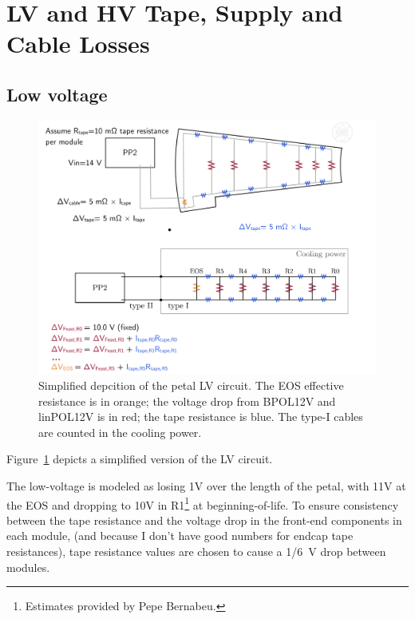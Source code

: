 
\section{LV and HV Tape, Supply and Cable Losses}

\subsection{Low voltage}
\label{low_voltage}

\begin{figure}[ht!]
\begin{center}
\includegraphics[width=0.74\linewidth]{figures/LV_cartoon.pdf}
\end{center}
\caption{Simplified depcition of the petal LV circuit. The EOS effective resistance is in orange;
the voltage drop from BPOL12V and linPOL12V is in red; the tape resistance is blue.
The type-I cables are counted in the cooling power.}
\label{lv_circuit}
\end{figure}

Figure~\ref{lv_circuit} depicts a simplified version of the LV circuit.

The low-voltage is modeled as losing 1V over the length of the petal, with 11V at the EOS and
dropping to 10V in R1\footnote{Estimates provided by Pepe Bernabeu.} at beginning-of-life.
To ensure consistency between
the tape resistance and the voltage drop in the front-end components in each module, (and because I
don't have good numbers for endcap tape resistances), tape resistance values are chosen to cause a
1/6~V drop between modules.

